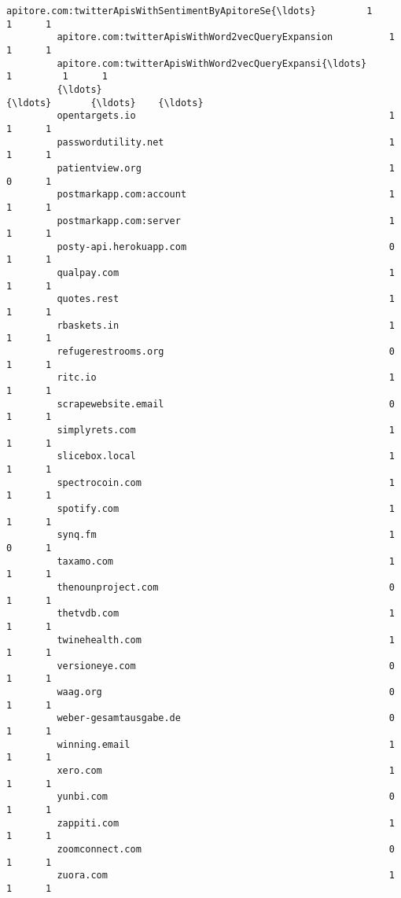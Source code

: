 \documentclass[11pt]{article}
\begin{document}
\begin{Verbatim}[commandchars=\\\{\}]
         apitore.com:twitterApisWithSentimentByApitoreSe{\ldots}         1         1      1   
         apitore.com:twitterApisWithWord2vecQueryExpansion          1         1      1   
         apitore.com:twitterApisWithWord2vecQueryExpansi{\ldots}         1         1      1   
         {\ldots}                                                      {\ldots}       {\ldots}    {\ldots}   
         opentargets.io                                             1         1      1   
         passwordutility.net                                        1         1      1   
         patientview.org                                            1         0      1   
         postmarkapp.com:account                                    1         1      1   
         postmarkapp.com:server                                     1         1      1   
         posty-api.herokuapp.com                                    0         1      1   
         qualpay.com                                                1         1      1   
         quotes.rest                                                1         1      1   
         rbaskets.in                                                1         1      1   
         refugerestrooms.org                                        0         1      1   
         ritc.io                                                    1         1      1   
         scrapewebsite.email                                        0         1      1   
         simplyrets.com                                             1         1      1   
         slicebox.local                                             1         1      1   
         spectrocoin.com                                            1         1      1   
         spotify.com                                                1         1      1   
         synq.fm                                                    1         0      1   
         taxamo.com                                                 1         1      1   
         thenounproject.com                                         0         1      1   
         thetvdb.com                                                1         1      1   
         twinehealth.com                                            1         1      1   
         versioneye.com                                             0         1      1   
         waag.org                                                   0         1      1   
         weber-gesamtausgabe.de                                     0         1      1   
         winning.email                                              1         1      1   
         xero.com                                                   1         1      1   
         yunbi.com                                                  0         1      1   
         zappiti.com                                                1         1      1   
         zoomconnect.com                                            0         1      1   
         zuora.com                                                  1         1      1   
         

\end{Verbatim}
\end{document}
